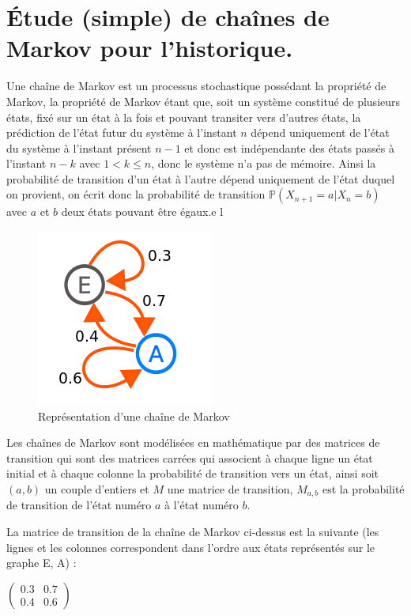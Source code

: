 \documentclass[final, 10pt]{report}
\begin{document}
\chapter{Étude (simple) de chaînes de Markov pour l’historique.}
Une chaîne de Markov est un processus stochastique possédant la propriété de Markov, la propriété de Markov étant que, soit un système constitué de plusieurs états, fixé sur un état à la fois et pouvant transiter vers d'autres états, la prédiction de l'état futur du système à l'instant $n$ dépend uniquement de l'état du système à l'instant présent $n-1$ et donc est indépendante des états passés à l'instant $n-k$ avec $1<k\leq n$, donc le système n'a pas de mémoire.
Ainsi la probabilité de transition d'un état à l'autre dépend uniquement de l'état duquel on provient, on écrit donc la probabilité de transition $\mathbb{P}(X_{n+1}=a | X_{n}=b)$ avec $a$ et $b$ deux états pouvant être égaux.e l
\begin{figure}[!h]
    \centering
    \includegraphics[scale=0.5]{img/markovChaine.png}
    \caption{Représentation d'une chaîne de Markov}
    \label{fig:chaine_markov}
\end{figure}

Les chaînes de Markov sont modélisées en mathématique par des matrices de transition qui sont des matrices carrées qui associent à chaque ligne un état initial et à chaque colonne la probabilité de transition vers un état, ainsi soit $(a,b)$ un couple d'entiers et $M$ une matrice de transition, $M_{a,b}$ est la probabilité de transition de l'état numéro $a$ à l'état numéro $b$.

La matrice de transition de la chaîne de Markov ci-dessus est la suivante (les lignes et les colonnes correspondent dans l'ordre aux états représentés sur le graphe E, A) : 

$\begin{pmatrix}
0.3 & 0.7 \\
0.4 & 0.6
\end{pmatrix}$
\end{document}
